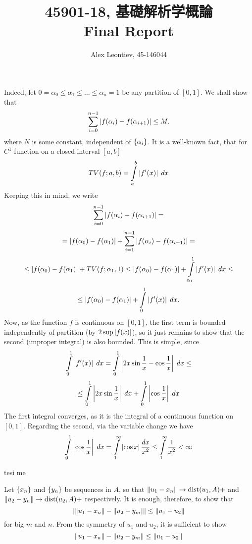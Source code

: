 \documentclass[10pt]{article} %
\title{45901-18, 基礎解析学概論\\Final Report}
\author{Alex Leontiev, 45-146044}
\begin{document}
\begin{CJK}{UTF8}{bsmi}
\maketitle
\end{CJK}
\begin{enumerate}[\bf{[}1{]}]
	\item Indeed, let $0=\alpha_0\leq\alpha_1\leq\hdots\leq\alpha_n=1$ be any partition of $[0,1]$. We shall show that
		\[\sum_{i=0}^{n-1}\myabs{f(\alpha_i)-f(\alpha_{i+1})}\leq M.\]
		where $N$ is some constant, independent of $\left\{\alpha_i\right\}$. It is a well-known fact, that for $C^1$ function
		on a closed interval $[a,b]$
		\[TV(f;a,b)=\int_a^b\myabs{f'(x)}\;dx\]
		Keeping this in mind, we write
		\[\sum_{i=0}^{n-1}\myabs{f(\alpha_i)-f(\alpha_{i+1})}=\]
		\[=\myabs{f(\alpha_0)-f(\alpha_1)}+\sum_{i=1}^{n-1}\myabs{f(\alpha_i)-f(\alpha_{i+1})}=\]
		\[\leq\myabs{f(\alpha_0)-f(\alpha_1)}+TV(f;\alpha_1,1)
		\leq\myabs{f(\alpha_0)-f(\alpha_1)}+\int_{\alpha_1}^1\myabs{f'(x)}\;dx\leq\]
		\[\leq\myabs{f(\alpha_0)-f(\alpha_1)}+\int_0^1\myabs{f'(x)}\;dx.\]
		Now, as the function $f$ is continuous on $[0,1]$, the first term is bounded independently of partition (by $2\sup
		\myabs{f(x)}$), so it just remains to show that the second (improper integral) is also bounded. This is simple, since
		\[\int_0^1\myabs{f'(x)}\;dx=\int_0^1\myabs{2x\sin\frac{1}{x}-\cos\frac{1}{x}}\;dx\leq\]
		\[\leq\int_0^1\myabs{2x\sin\frac{1}{x}}\;dx+\int_0^1\myabs{\cos\frac{1}{x}}\;dx\]
		The first integral converges, as it is the integral of a continuous function on $[0,1]$. Regarding the second,
		via the variable change we have
		\[\int_0^1\myabs{\cos\frac{1}{x}}\;dx=\int_1^{\infty}\myabs{\cos x}\frac{dx}{x^2}\leq\int_1^{\infty}\frac{1}{x^2}
		<\infty\]
	\item tesi me %
		\setcounter{enumi}{5}
	\item Let $\left\{x_n\right\}$ and
		$\left\{y_n\right\}$ be sequences in $A$, so that $\|u_1-x_n\|\to\mbox{dist}(u_1,A)+$ and $\|u_2-y_n\|\to\mbox{dist}(u_2,A)+$ 
		respectively. It is enough, therefore, to show that 
		\[\left|\|u_1-x_n\|-\|u_2-y_m\|\right|\leq\|u_1-u_2\|\]
		for big $m$ and $n$. From the symmetry of $u_1$ and $u_2$, it is sufficient to show
		\[{\|u_1-x_n\|-\|u_2-y_m\|}\leq\|u_1-u_2\|\]
\end{enumerate}
\end{document}
